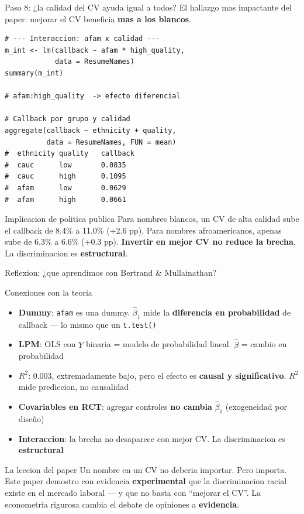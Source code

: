 \documentclass[aspectratio=169, 11pt]{beamer}
\begin{document}
\begin{frame}[fragile]{Paso 8: ¿la calidad del CV ayuda igual a todos?}
\small
El hallazgo mas impactante del paper: mejorar el CV beneficia \textbf{mas a los blancos}.

\begin{lstlisting}[basicstyle=\ttfamily\scriptsize]
# --- Interaccion: afam x calidad ---
m_int <- lm(callback ~ afam * high_quality,
            data = ResumeNames)
summary(m_int)

# afam:high_quality  -> efecto diferencial

# Callback por grupo y calidad
aggregate(callback ~ ethnicity + quality,
          data = ResumeNames, FUN = mean)
#  ethnicity quality   callback
#  cauc      low       0.0835
#  cauc      high      0.1095
#  afam      low       0.0629
#  afam      high      0.0661
\end{lstlisting}

\vspace{0.1cm}
\begin{alertblock}{Implicacion de politica publica}
\small Para nombres blancos, un CV de alta calidad sube el callback de 8.4\% a 11.0\% (+2.6 pp). Para nombres afroamericanos, apenas sube de 6.3\% a 6.6\% (+0.3 pp). \textbf{Invertir en mejor CV no reduce la brecha}. La discriminacion es \textbf{estructural}.
\end{alertblock}
\end{frame}

\begin{frame}{Reflexion: ¿que aprendimos con Bertrand \& Mullainathan?}
\small
\begin{exampleblock}{Conexiones con la teoria}
\begin{itemize}\setlength{\itemsep}{3pt}
  \item \textbf{Dummy}: \texttt{afam} es una dummy. $\hat{\beta}_1$ mide la \textbf{diferencia en probabilidad} de callback --- lo mismo que un \texttt{t.test()}
  \item \textbf{LPM}: OLS con $Y$ binaria = modelo de probabilidad lineal. $\hat{\beta}$ = cambio en probabilidad
  \item \textbf{$R^2$}: $0.003$, extremadamente bajo, pero el efecto es \textbf{causal y significativo}. $R^2$ mide prediccion, no causalidad
  \item \textbf{Covariables en RCT}: agregar controles \textbf{no cambia} $\hat{\beta}_1$ (exogeneidad por dise\~no)
  \item \textbf{Interaccion}: la brecha no desaparece con mejor CV. La discriminacion es \textbf{estructural}
\end{itemize}
\end{exampleblock}

\vspace{0.2cm}
\begin{alertblock}{La leccion del paper}
\small Un nombre en un CV no deberia importar. Pero importa. Este paper demostro con evidencia \textbf{experimental} que la discriminacion racial existe en el mercado laboral --- y que no basta con ``mejorar el CV''. La econometria rigurosa cambia el debate de opiniones a \textbf{evidencia}.
\end{alertblock}
\end{frame}
\end{document}
